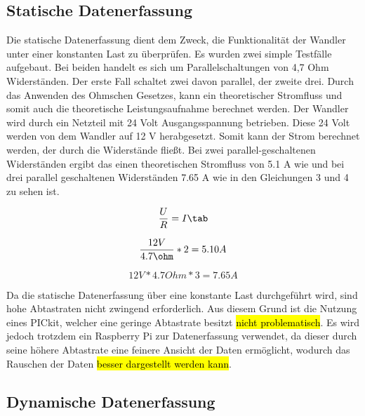 \subsection{Statische Datenerfassung}

Die statische Datenerfassung dient dem Zweck, die Funktionalität der Wandler unter einer konstanten Last zu überprüfen. Es wurden zwei simple Testfälle aufgebaut. Bei beiden handelt es sich um Parallelschaltungen von 4,7 Ohm Widerständen. Der erste Fall schaltet zwei davon parallel, der zweite drei. Durch das Anwenden des Ohmschen Gesetzes, kann ein theoretischer Stromfluss und somit auch die theoretische Leistungsaufnahme berechnet werden. Der Wandler wird durch ein Netzteil mit 24 Volt Ausgangsspannung betrieben. Diese 24 Volt werden von dem Wandler auf 12 V herabgesetzt. Somit kann der Strom berechnet werden, der durch die Widerstände fließt. Bei zwei parallel-geschaltenen Widerständen ergibt das einen theoretischen Stromfluss von 5.1 A wie und bei drei parallel geschaltenen Widerständen 7.65 A wie in den Gleichungen 3 und 4 zu sehen ist.

\begin{equation}
\label{Ohmsches Gesetz}
\frac{U}{R} = I \tab
\end{equation}


\begin{equation}
\label{Ohmsches Gesetz}
\frac{12V}{4.7 \ohm}*2 = 5.10 A 
\end{equation}


\begin{equation}
\label{Ohmsches Gesetz}
12V*4.7 Ohm*3 = 7.65 A 
\end{equation}


Da die statische Datenerfassung über eine konstante Last durchgeführt wird, sind hohe Abtastraten nicht zwingend erforderlich. Aus diesem Grund ist die Nutzung eines PICkit, welcher eine geringe Abtastrate besitzt \hl{nicht problematisch}. Es wird jedoch trotzdem ein Raspberry Pi zur Datenerfassung verwendet, da dieser durch seine höhere Abtastrate eine feinere Ansicht der Daten ermöglicht, wodurch das Rauschen der Daten \hl{besser dargestellt werden kann}. 

\subsection{Dynamische Datenerfassung}

